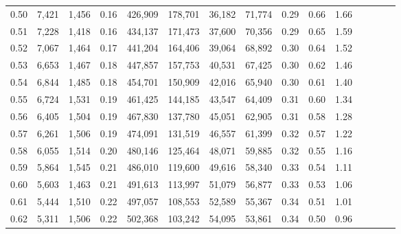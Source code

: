 \begin{tabular}{rrrcrrrrrrrrrrr}
0.50 &   7,421 &   1,456 &                                       0.16 &  426,909 &  178,701 &   36,182 &   71,774 &  0.29 &  0.66 &                         1.66 \\
0.51 &   7,228 &   1,418 &                                       0.16 &  434,137 &  171,473 &   37,600 &   70,356 &  0.29 &  0.65 &                         1.59 \\
0.52 &   7,067 &   1,464 &                                       0.17 &  441,204 &  164,406 &   39,064 &   68,892 &  0.30 &  0.64 &                         1.52 \\
0.53 &   6,653 &   1,467 &                                       0.18 &  447,857 &  157,753 &   40,531 &   67,425 &  0.30 &  0.62 &                         1.46 \\
0.54 &   6,844 &   1,485 &                                       0.18 &  454,701 &  150,909 &   42,016 &   65,940 &  0.30 &  0.61 &                         1.40 \\
0.55 &   6,724 &   1,531 &                                       0.19 &  461,425 &  144,185 &   43,547 &   64,409 &  0.31 &  0.60 &                         1.34 \\
0.56 &   6,405 &   1,504 &                                       0.19 &  467,830 &  137,780 &   45,051 &   62,905 &  0.31 &  0.58 &                         1.28 \\
0.57 &   6,261 &   1,506 &                                       0.19 &  474,091 &  131,519 &   46,557 &   61,399 &  0.32 &  0.57 &                         1.22 \\
0.58 &   6,055 &   1,514 &                                       0.20 &  480,146 &  125,464 &   48,071 &   59,885 &  0.32 &  0.55 &                         1.16 \\
0.59 &   5,864 &   1,545 &                                       0.21 &  486,010 &  119,600 &   49,616 &   58,340 &  0.33 &  0.54 &                         1.11 \\
0.60 &   5,603 &   1,463 &                                       0.21 &  491,613 &  113,997 &   51,079 &   56,877 &  0.33 &  0.53 &                         1.06 \\
0.61 &   5,444 &   1,510 &                                       0.22 &  497,057 &  108,553 &   52,589 &   55,367 &  0.34 &  0.51 &                         1.01 \\
0.62 &   5,311 &   1,506 &                                       0.22 &  502,368 &  103,242 &   54,095 &   53,861 &  0.34 &  0.50 &                         0.96 \\

\end{tabular}

